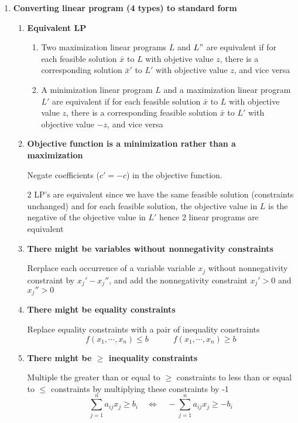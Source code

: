 \documentclass[11pt]{article}
\begin{document}
\begin{defn*}
\begin{enumerate}
\begin{enumerate}
        \end{enumerate}
        \item \textbf{Converting linear program (4 types) to standard form}
        \begin{enumerate}
            \item \textbf{Equivalent LP} 
            \begin{enumerate}
                \item Two maximization linear programs $L$ and $L"$ are equivalent if for each feasible solution $\bar{x}$ to $L$ with objetive value $z$, there is a corresponding solution $\bar{x}'$ to $L'$ with objective value $z$, and vice versa
                \item A minimization linear program $L$ and a maximization linear program $L'$ are equivalent if for each feasible solution $\bar{x}$ to $L$ with objective value $z$, there is a corresponding feasible solution $\bar{x}$ to $L'$ with objective value $-z$, and vice versa
            \end{enumerate}
            \item \textbf{Objective function is a minimization rather than a maximization} \\
            \begin{center}
                Negate coefficients ($c' = -c$) in the objective function.
            \end{center}
            2 LP's are equivalent since we have the same feasible solution (constraints unchanged) and for each feasible solution, the objective value in $L$ is the negative of the objective value in $L'$ hence 2 linear programs are equivalent
            \item \textbf{There might be variables without nonnegativity constraints}
            \begin{center}
                Rerplace each occurrence of a variable variable $x_j$ without nonnegativity constraint by $x_j' - x_j''$, and add the nonnegativity constraint $x_j' > 0$ and $x_j'' > 0$
            \end{center}
            \item \textbf{There might be equality constraints}
            \begin{center}
                Replace equality constraints with a pair of inequality constraints 
                \[
                    f(x_1,\cdots, x_n) \leq b \quad \quad \quad f(x_1,\cdots, x_n) \geq b
                \]
            \end{center}
            \item \textbf{There might be $\geq$ inequality constraints}
            \begin{center}
                Multiple the greater than or equal to $\geq$ constraints to less than or equal to $\leq$ constraints by multiplying these constraints by -1
                \[
                    \sum_{j=1}^n a_{ij}x_j \geq b_i \quad \iff \quad  -\sum_{j=1}^n a_{ij}x_j \geq -b_i  
                \]
            \end{center}
        \end{enumerate}
    \end{enumerate}
    

\end{defn*}
\end{document}
